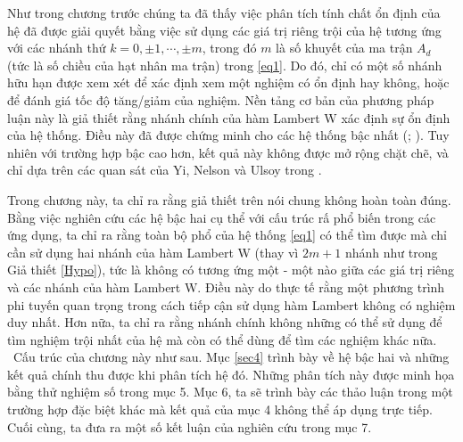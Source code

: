 %
Như trong chương trước chúng ta đã thấy việc phân tích tính chất ổn định của hệ đã được giải quyết bằng việc sử dụng các giá trị riêng trội của hệ tương ứng với các nhánh thứ 
$k = 0, \pm 1 , \cdots , \pm m$, trong đó $m$ là số khuyết của ma trận $A_d$ (tức là số chiều của hạt nhân ma trận) trong \eqref{eq1}. Do đó, chỉ có một số nhánh hữu hạn được xem xét để xác định xem một nghiệm có ổn định hay không, hoặc để đánh giá tốc độ tăng/giảm của nghiệm. 
Nền tảng cơ bản của phương pháp luận này là giả thiết rằng nhánh chính của hàm Lambert W xác định sự ổn định của hệ thống. Điều này đã được chứng minh cho các hệ thống bậc nhất (\cite{AslU03}; \cite{Shi06}). Tuy nhiên với trường hợp bậc cao hơn, kết quả này không được mở rộng chặt chẽ, và chỉ dựa trên các quan sát của Yi, Nelson và Ulsoy trong \cite{Yi07}.

 
Trong chương này, ta chỉ ra rằng giả thiết trên nói chung không hoàn toàn đúng. Bằng việc nghiên cứu các hệ bậc hai cụ thể với cấu trúc rấ phổ biến trong các ứng dụng, ta chỉ ra rằng toàn bộ phổ của hệ thống \eqref{eq1} có thể tìm được mà chỉ cần sử dụng hai nhánh của hàm Lambert W (thay vì $2m+1$ nhánh như trong Giả thiết \ref{Hypo}), tức là không có tương ứng một - một nào giữa các giá trị riêng và các nhánh của hàm Lambert W. Điều này do thực tế rằng một phương trình phi tuyến quan trọng trong cách tiếp cận sử dụng hàm Lambert không có nghiệm duy nhất. Hơn nữa, ta chỉ ra rằng nhánh chính không những có thể sử dụng để tìm nghiệm trội nhất của hệ mà còn có thể dùng để tìm các nghiệm khác nữa. \ Cấu trúc của chương này như sau. Mục \ref{sec4} trình bày về hệ bậc hai và những kết quả chính thu được khi phân tích hệ đó. Những phân tích này được minh họa bằng thử nghiệm số trong mục 5. Mục 6, ta sẽ trình bày các thảo luận trong một trường hợp đặc biệt khác mà kết quả của mục 4 không thể áp dụng trực tiếp. Cuối cùng, ta đưa ra một số kết luận của nghiên cứu trong mục 7.\\


